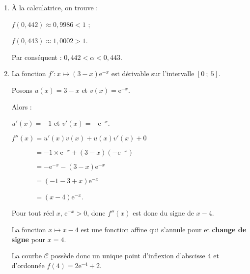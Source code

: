 \begin{corrige}
\begin{enumerate}
          Sur l'intervalle $[0~;~3]$, $f$ est \textbf{continue} et \textbf{strictement croissante}. 1 appartient à l'intervalle $[0~;\text{e}^{-3}+2 ]$ donc l'équation $f(x)=1$ admet une unique solution sur l'intervalle $[0~;~3]$.
          \par
          Sur l'intervalle $[3~;~5]$, le minimum de $f$ est supérieur à 2 donc l'équation ${f(x)=1}$ n'a pas de solution sur cet intervalle.
          \par
          Par conséquent, l'équation $f(x)=1$ admet une unique solution sur l'intervalle $[0~;~5]$.
          \item %
          \`A la calculatrice, on trouve :
          \par
          $f(0,442) \approx 0,9986 < 1$ ;
          \par
          $f(0,443) \approx 1,0002 > 1$.
          \par
          Par conséquent : $0,442 < \alpha < 0,443$.
          \par
          \item %
          La fonction $f' : x \longmapsto (3-x)\text{e}^{-x}$ est dérivable sur l'intervalle $[0~;~5]$.
          \par
          Posons $u(x)=3-x$ et $v(x)=\text{e}^{-x}$.
          \par
          Alors :
          \par
          $u'(x)=-1$ et $v'(x)=-\text{e}^{-x}$.
          \par
          $f''(x)=u'(x)v(x)+u(x)v'(x) + 0$
          \par
          $\phantom{f''(x)}= -1 \times \text{e}^{-x}+(3-x)(-\text{e}^{-x})$
          \par
          $\phantom{f''(x)}= -\text{e}^{-x}-(3-x)\text{e}^{-x}$
          \par
          $\phantom{f''(x)}=(-1-3+x)\text{e}^{-x}$
          \par
          $\phantom{f''(x)}=(x-4)\text{e}^{-x}$.
          \par
          Pour tout réel $x$, ${\text{e}^{-x} > 0}$, donc $f''(x)$ est donc du signe de $x-4$.
          \par
          La fonction $x \longmapsto x-4$ est une fonction affine qui s'annule pour et \textbf{change de signe} pour $x=4$.
          \par
          La courbe $\mathscr{C}$ possède donc un unique point d'inflexion d'abscisse $4$ et d'ordonnée $f(4)=2 \text{e}^{-4}+2$.
          \par
     \end{enumerate}
\end{corrige}
